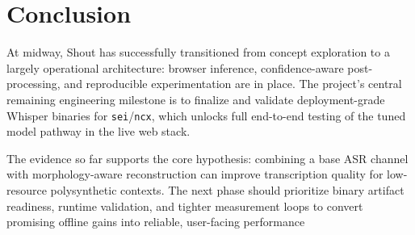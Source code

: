 \documentclass[11pt]{article}
\begin{document}
\section{Conclusion}
At midway, Shout has successfully transitioned from concept exploration to a largely operational architecture: browser inference, confidence-aware post-processing, and reproducible experimentation are in place. The project's central remaining engineering milestone is to finalize and validate deployment-grade Whisper binaries for \texttt{sei}/\texttt{ncx}, which unlocks full end-to-end testing of the tuned model pathway in the live web stack.

The evidence so far supports the core hypothesis: combining a base ASR channel with morphology-aware reconstruction can improve transcription quality for low-resource polysynthetic contexts. The next phase should prioritize binary artifact readiness, runtime validation, and tighter measurement loops to convert promising offline gains into reliable, user-facing performance
\end{document}
